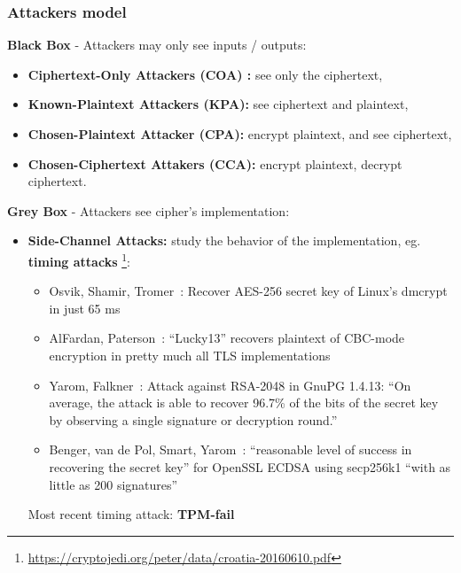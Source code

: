 \documentclass{beamer}
\begin{document}
\begin{frame}[allowframebreaks]
        \frametitle{Attackers model}
        {\bf Black Box} - Attackers may only see inputs / outputs:
        \begin{itemize}
          \item {\bf Ciphertext-Only Attackers (COA) :} see only the ciphertext,
          \item {\bf Known-Plaintext Attackers (KPA):} see ciphertext and plaintext,
          \item {\bf Chosen-Plaintext Attacker (CPA):} encrypt plaintext, and
            see ciphertext, 
          \item {\bf Chosen-Ciphertext Attakers (CCA):} encrypt plaintext,
            decrypt ciphertext.
        \end{itemize}

        \framebreak

        {\bf Grey Box} - Attackers see cipher's implementation:
        \begin{itemize}
          \item {\bf Side-Channel Attacks:} study the behavior of the
            implementation, eg. {\bf timing attacks }\footnote{\url{https://cryptojedi.org/peter/data/croatia-20160610.pdf}}:
            \begin{itemize}

              \item Osvik, Shamir, Tromer~\cite{aes2006}: Recover AES-256 secret
                key of Linux’s dmcrypt in just 65 ms
              \item AlFardan, Paterson~\cite{lucky13}: “Lucky13” recovers plaintext of CBC-mode encryption in pretty much all TLS implementations
              \item Yarom, Falkner~\cite{gpg2014}: Attack against RSA-2048 in GnuPG 1.4.13: “On average, the attack is able to recover 96.7\% of the bits of the secret key by observing a single signature or decryption round.”
              \item Benger, van de Pol, Smart, Yarom~\cite{openssl2014}: “reasonable level of success in recovering the secret key” for OpenSSL ECDSA using secp256k1 “with as little as 200 signatures”

            \end{itemize}

        \framebreak
        Most recent timing attack: {\bf TPM-fail }~\cite{244048}

        \vspace{10 mm}


\end{itemize}
\end{frame}
\end{document}
